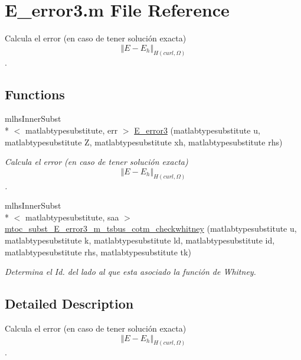\hypertarget{a00019}{\section{E\-\_\-error3.\-m File Reference}
\label{a00019}
}


Calcula el error (en caso de tener solución exacta) \[ \Vert E-E_h \Vert_{H(curl,\Omega)} \].  


\subsection*{Functions}
\begin{DoxyCompactItemize}
\item 
mlhs\-Inner\-Subst\\*
$<$ matlabtypesubstitute, err $>$ \hyperlink{a00019_a29de8f298869566020d8775a9b41b8c4}{E\-\_\-error3} (matlabtypesubstitute u, matlabtypesubstitute Z, matlabtypesubstitute xh, matlabtypesubstitute rhs)
\begin{DoxyCompactList}\small\item\em Calcula el error (en caso de tener solución exacta) \[ \Vert E-E_h \Vert_{H(curl,\Omega)} \]. \end{DoxyCompactList}\item 
mlhs\-Inner\-Subst\\*
$<$ matlabtypesubstitute, saa $>$ \hyperlink{a00019_a97545bbb7f20a11107225170ca296c3b}{mtoc\-\_\-subst\-\_\-\-E\-\_\-error3\-\_\-m\-\_\-tsbus\-\_\-cotm\-\_\-checkwhitney} (matlabtypesubstitute u, matlabtypesubstitute k, matlabtypesubstitute ld, matlabtypesubstitute id, matlabtypesubstitute rhs, matlabtypesubstitute tk)
\begin{DoxyCompactList}\small\item\em Determina el Id. del lado al que esta asociado la función de Whitney. \end{DoxyCompactList}\end{DoxyCompactItemize}


\subsection{Detailed Description}
Calcula el error (en caso de tener solución exacta) \[ \Vert E-E_h \Vert_{H(curl,\Omega)} \]. 

